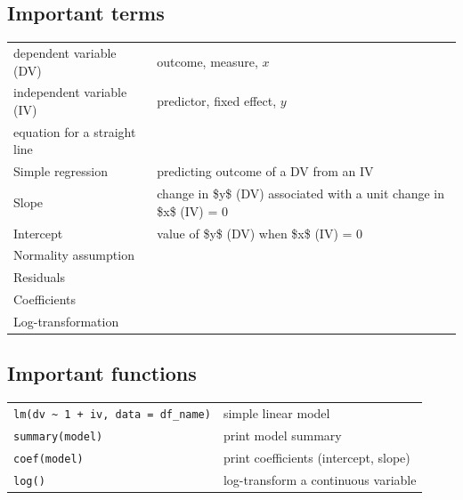 \documentclass[
  letterpaper,
  DIV=11,
  numbers=noendperiod]{scrartcl}
\begin{document}
\hypertarget{important-terms}{%
\subsection*{Important terms}\label{important-terms}}

\begin{longtable}[]{@{}
  >{\raggedright\arraybackslash}p{}
  >{\raggedright\arraybackslash}p{}@{}}
\toprule\noalign{}
\endhead
\bottomrule\noalign{}
\endlastfoot
dependent variable (DV) & outcome, measure, \(x\) \\
independent variable (IV) & predictor, fixed effect, \(y\) \\
equation for a straight line & \\
Simple regression & predicting outcome of a DV from an IV \\
Slope & change in \$y\$ (DV) associated with a unit change in \$x\$ (IV)
= 0 \\
Intercept & value of \$y\$ (DV) when \$x\$ (IV) = 0 \\
Normality assumption & \\
Residuals & \\
Coefficients & \\
Log-transformation & \\
\end{longtable}

\hypertarget{important-functions}{%
\subsection*{Important functions}\label{important-functions}}

\begin{longtable}[]{@{}
  >{\raggedright\arraybackslash}p{}
  >{\raggedright\arraybackslash}p{}@{}}
\toprule\noalign{}
\endhead
\bottomrule\noalign{}
\endlastfoot
\texttt{lm(dv\ \textasciitilde{}\ 1\ +\ iv,\ data\ =\ df\_name)} &
simple linear model \\
\texttt{summary(model)} & print model summary \\
\texttt{coef(model)} & print coefficients (intercept, slope) \\
\texttt{log()} & log-transform a continuous variable \\
\end{longtable}
\end{document}
